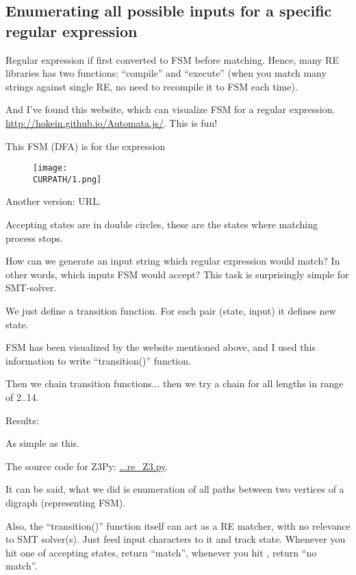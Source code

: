 \subsection{Enumerating all possible inputs for a specific regular expression}

\renewcommand{\CURPATH}{regexp/SMT}

Regular expression if first converted to \ac{FSM} before matching.
Hence, many \ac{RE} libraries has two functions: ``compile'' and ``execute''
(when you match many strings against single \ac{RE}, no need to recompile it to \ac{FSM} each time).

And I've found this website, which can visualize \ac{FSM} for a regular expression.
\url{http://hokein.github.io/Automata.js/}.
This is fun!

This \ac{FSM} (\ac{DFA}) is for the expression 

\begin{figure}[H]
\centering
\texttt{[image: \\CURPATH/1.png]}
\caption{}
\end{figure}

Another version: URL.

Accepting states are in double circles, these are the states where matching process stops.

How can we generate an input string which regular expression would match?
In other words, which inputs \ac{FSM} would accept?
This task is surprisingly simple for SMT-solver.

We just define a transition function.
For each pair (state, input) it defines new state.

\ac{FSM} has been visualized by the website mentioned above, and I used this information to write ``transition()'' function.

Then we chain transition functions... then we try a chain for all lengths in range of 2..14.



Results:



As simple as this.

The source code for Z3Py: \url{...re_Z3.py}.

It can be said, what we did is enumeration of all paths between two vertices of a digraph (representing \ac{FSM}).

Also, the ``transition()'' function itself can act as a RE matcher, with no relevance to SMT solver(s).
Just feed input characters to it and track state.
Whenever you hit one of accepting states, return ``match'', whenever you hit , return ``no match''.


